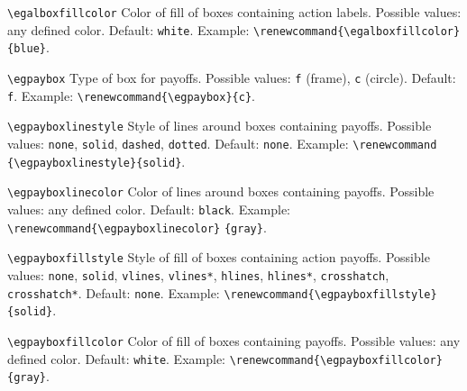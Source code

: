 \documentclass[12pt]{article}
\begin{document}
\vspace{4mm}

\sloppy
\noindent\verb+\egalboxfillcolor+\newline
\noindent Color of fill of boxes containing action labels.  Possible values:
any defined color.  Default: \verb+white+.  Example:
\verb+\renewcommand{\egalboxfillcolor}+ \verb+{blue}+.

\fussy
\vspace{4mm}

\noindent\verb+\egpaybox+\newline
\noindent Type of box for payoffs.  Possible values: \verb+f+ (frame),
\verb+c+ (circle).  Default: \verb+f+.  Example:
\verb+\renewcommand{\egpaybox}{c}+.

\vspace{4mm}

\sloppy
\noindent\verb+\egpayboxlinestyle+\newline
\noindent Style of lines around boxes containing payoffs.  Possible values:
\verb+none+, \verb+solid+, \verb+dashed+, \verb+dotted+.  Default:
\verb+none+.  Example: \verb+\renewcommand+
\verb+{\egpayboxlinestyle}{solid}+.

\fussy
\vspace{4mm}

\noindent\verb+\egpayboxlinecolor+\newline
\noindent Color of lines around boxes containing payoffs.  Possible values:
any defined color.  Default: \verb+black+.  Example:
\verb+\renewcommand{\egpayboxlinecolor}+ \verb+{gray}+.

\vspace{4mm}

\noindent\verb+\egpayboxfillstyle+\newline
\noindent Style of fill of boxes containing action payoffs.  Possible values:
\verb+none+, \verb+solid+, \verb+vlines+, \verb+vlines*+, \verb+hlines+,
\verb+hlines*+, \verb+crosshatch+, \verb+crosshatch*+.  Default: \verb+none+. 
Example: \verb+\renewcommand{\egpayboxfillstyle}{solid}+.

\vspace{4mm}

\noindent\verb+\egpayboxfillcolor+\newline
\noindent Color of fill of boxes containing payoffs.  Possible values: any
defined color.  Default: \verb+white+.  Example:
\verb+\renewcommand{\egpayboxfillcolor}{gray}+.

\vspace{4mm}
\end{document}
